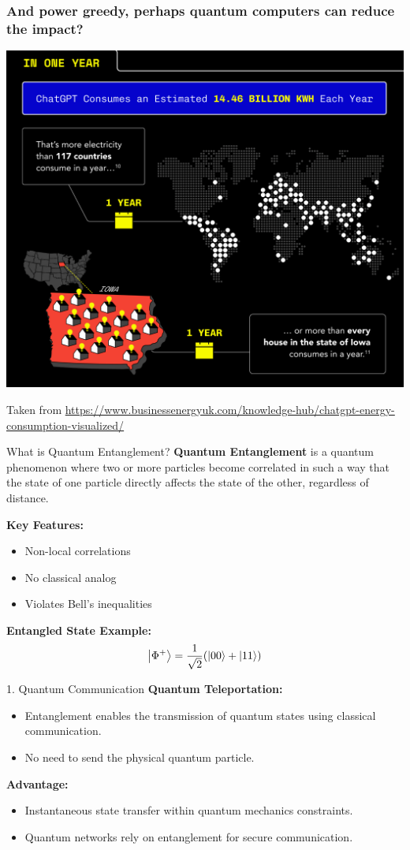 \documentclass{beamer}
\begin{document}
\begin{frame}
\frametitle{And power greedy, perhaps quantum computers can reduce the impact?}

\centerline{\includegraphics[width=0.7\linewidth]{figures/aitalk1.png}}
Taken from \url{https://www.businessenergyuk.com/knowledge-hub/chatgpt-energy-consumption-visualized/}
\end{frame}




\begin{frame}{What is Quantum Entanglement?}
\textbf{Quantum Entanglement} is a quantum phenomenon where two or more particles become correlated in such a way that the state of one particle directly affects the state of the other, regardless of distance.

\vspace{10pt}
\textbf{Key Features:}
\begin{itemize}
    \item Non-local correlations
    \item No classical analog
    \item Violates Bell's inequalities
\end{itemize}

\textbf{Entangled State Example:}
\[
\ket{\Phi^+} = \frac{1}{\sqrt{2}} (\ket{00} + \ket{11})
\]

\end{frame}


\begin{frame}{1. Quantum Communication}
\textbf{Quantum Teleportation:}
\begin{itemize}
    \item Entanglement enables the transmission of quantum states using classical communication.
    \item No need to send the physical quantum particle.
\end{itemize}

\textbf{Advantage:}
\begin{itemize}
\item Instantaneous state transfer within quantum mechanics constraints.
\item Quantum networks rely on entanglement for secure communication.
  \end{itemize}
\end{frame}
\end{document}
